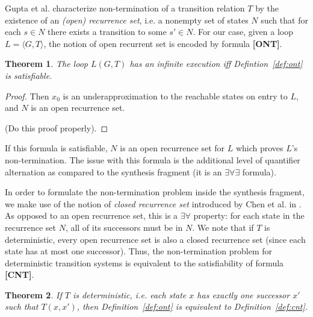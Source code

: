 \documentclass[preprint]{sigplanconf}
\newtheorem{theorem}{Theorem}
\theoremstyle{definition}
\begin{document}
Gupta et al. \cite{DBLP:conf/popl/GuptaHMRX08} characterize non-termination of a transition relation $T$ by the existence of an \emph{(open) recurrence set},
i.e. a nonempty set of states $N$ such that for each $s \in N$ there
exists a transition to some $s'\in N$. 
For our case, given a loop $L = \langle G,T \rangle$, the notion of open recurrent set is encoded by formula {\bf [ONT]}. %

\begin{theorem}
\label{thm:ont}
 The loop $L(G, T)$ has an infinite execution iff Defintion~\ref{def:ont} is satisfiable.
\end{theorem}

\begin{proof}
 Then $x_0$ is an underapproximation to the reachable states on entry to $L$, and $N$ is an open recurrence set.
 
 (Do this proof properly).
\end{proof}

If this formula is satisfiable, $N$ is an open recurrence set for $L$ which proves
$L$'s non-termination. The issue with this formula is the additional level of quantifier alternation as compared to the synthesis fragment
(it is an $\exists \forall \exists$ formula). %

In order to formulate the non-termination problem inside the synthesis fragment, 
we make use of the notion of \emph{closed recurrence set} introduced by Chen et al. in \cite{DBLP:conf/tacas/ChenCFNO14}. 
As opposed to an open recurrence set, this is a $\exists \forall$ property: for each state in the recurrence set $N$, all of its successors 
must be in $N$. We note that if $T$ is deterministic, every open recurrence set is also a closed recurrence set (since each
state has at most one successor).  Thus, the non-termination problem for deterministic transition systems is equivalent to the
satisfiability of formula {\bf [CNT]}. %

\begin{theorem}
\label{thm:cnt}
 If $T$ is deterministic, i.e. each state $x$ has exactly one successor $x'$ such that $T(x, x')$, then
 Definition~\ref{def:ont} is equivalent to Definition~\ref{def:cnt}.
\end{theorem}
\end{document}
